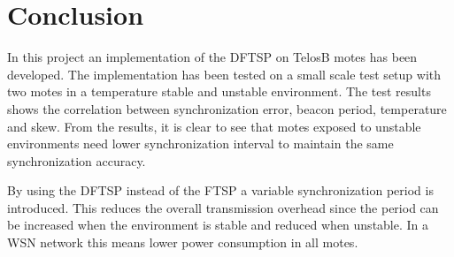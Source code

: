 \documentclass[Main]{subfiles}
\begin{document}
\section{Conclusion} %
\label{sec:conclusion}
	In this project an implementation of the DFTSP on TelosB motes has been developed. 
	The implementation has been tested on a small scale test setup with two motes in a temperature stable and unstable environment. 
	The test results shows the correlation between synchronization error, beacon period, temperature and skew.
	From the results, it is clear to see that motes exposed to unstable environments need lower synchronization interval to maintain the same synchronization accuracy.

	By using the DFTSP instead of the FTSP a variable synchronization period is introduced. This reduces the overall transmission overhead since the period can be increased when the environment is stable and reduced when unstable.
	In a WSN network this means lower power consumption in all motes.

\end{document}
